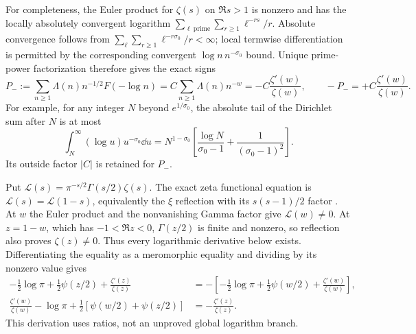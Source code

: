 \documentclass[11pt]{article}
\begin{document}
For completeness, the Euler product for $\zeta(s)$ on $\Re s>1$
\cite{Zeta} is nonzero and has the locally absolutely convergent logarithm
$\sum_{\ell\ \mathrm{prime}}\sum_{r\ge1}\ell^{-rs}/r$.
Absolute convergence follows from
$\sum_\ell\sum_{r\ge1}\ell^{-r\sigma_0}/r<\infty$;
local termwise differentiation is permitted by the corresponding convergent
$\log n\,n^{-\sigma_0}$ bound. Unique prime-power factorization therefore
gives the exact signs
\begin{equation}\tag{MA20}
 P_-:=\sum_{n\ge1}\Lambda(n)n^{-1/2}F(-\log n)
 =C\sum_{n\ge1}\Lambda(n)n^{-w}
 =-C\frac{\zeta'(w)}{\zeta(w)},\qquad
 -P_-=+C\frac{\zeta'(w)}{\zeta(w)}.
\end{equation}
For example, for any integer $N$ beyond $e^{1/\sigma_0}$, the absolute tail
of the Dirichlet sum after $N$ is at most
\[
 \int_N^\infty(\log u)u^{-\sigma_0}\dd u
 =N^{1-\sigma_0}\left[\frac{\log N}{\sigma_0-1}
                       +\frac1{(\sigma_0-1)^2}\right].
\]
Its outside factor $|C|$ is retained for $P_-$.

Put $\mathscr L(s)=\pi^{-s/2}\Gamma(s/2)\zeta(s)$.
The exact zeta functional equation is $\mathscr L(s)=\mathscr L(1-s)$,
equivalently the $\xi$ reflection with its $s(s-1)/2$ factor
\cite{Zeta}. At $w$ the Euler product and the nonvanishing Gamma factor
give $\mathscr L(w)\ne0$. At $z=1-w$, which has $-1<\Re z<0$,
$\Gamma(z/2)$ is finite and nonzero, so reflection also proves
$\zeta(z)\ne0$. Thus every logarithmic derivative below exists.
Differentiating the equality as a meromorphic equality and dividing by its
nonzero value gives
\begin{equation}\tag{MA21}\begin{aligned}
 -\tfrac12\log\pi+\tfrac12\psi(z/2)+\frac{\zeta'(z)}{\zeta(z)}
 &=-\left[-\tfrac12\log\pi+\tfrac12\psi(w/2)
                           +\frac{\zeta'(w)}{\zeta(w)}\right],\\
 \frac{\zeta'(w)}{\zeta(w)}-\log\pi
 +\tfrac12[\psi(w/2)+\psi(z/2)]
 &=-\frac{\zeta'(z)}{\zeta(z)}.
\end{aligned}\end{equation}
This derivation uses ratios, not an unproved global logarithm branch.
\end{document}
